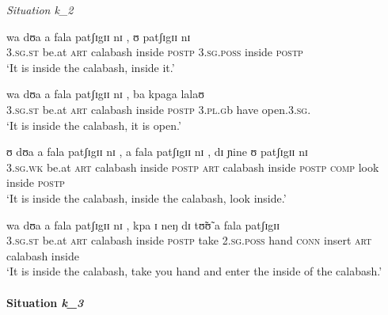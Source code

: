 

\begin{exe}
\ex\label{ex:k2}\textit{Situation {\it k_{2}}}\\
 \begin{xlist}
  \ex\label{ex:k2-A-w}
\gll  wa dʊa a fala patʃɪgɪɪ nɪ , ʊ patʃɪgɪɪ nɪ \\
\textsc{3.sg.st} be.at \textsc{art} calabash inside \textsc{postp} {}
\textsc{3.sg.poss} inside \textsc{postp} \\

\glt `It is inside the calabash, inside it.'

\ex\label{ex:k2-A-d}
\gll   wa dʊa a fala patʃɪgɪɪ nɪ , ba kpaga lalaʊ\\
\textsc{3.sg.st} be.at \textsc{art} calabash inside \textsc{postp} {}
\textsc{3.pl.g}b have open.\textsc{3.sg}.\\

\glt `It is inside the calabash, it is open.'


\ex\label{ex:k2-B-t}
\gll  ʊ dʊa a fala patʃɪgɪɪ nɪ , a fala patʃɪgɪɪ nɪ , dɪ ɲine ʊ patʃɪgɪɪ nɪ\\
\textsc{3.sg.wk} be.at \textsc{art} calabash inside \textsc{postp} {}
\textsc{art} calabash inside \textsc{postp}  {} \textsc{comp} look   inside
\textsc{postp} \\

\glt `It is inside the calabash, inside the calabash, look inside.'


\ex\label{ex:k2-B-m}
\gll  wa dʊa a fala patʃɪgɪɪ nɪ ,  kpa ɪ neŋ dɪ tʊ̃ʊ̃ a fala patʃɪgɪɪ\\
\textsc{3.sg.st} be.at \textsc{art} calabash inside \textsc{postp} {} take
\textsc{2.sg.poss} hand \textsc{conn} insert \textsc{art} calabash inside\\

\glt `It is inside the calabash,  take you hand and enter the inside
of the calabash.'


 \end{xlist}

\end{exe}



\paragraph{Situation {\it k_{3}}}
\label{sec:SPA-exper1-loca}


